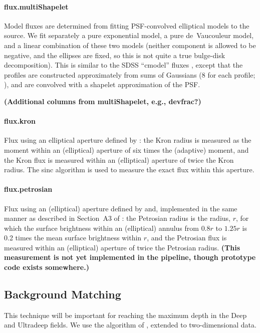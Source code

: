 \documentclass[12pt]{article}
\newcommand\tbd[1]{\textbf{\color{red}(#1)}}
\begin{document}
\paragraph{flux.multiShapelet}
Model fluxes are determined from fitting PSF-convolved elliptical models to the source.  We fit separately a
pure exponential model, a pure de\ Vaucouleur model, and a linear combination of these two models (neither
component is allowed to be negative, and the ellipses are fixed, so this is not quite a true bulge-disk
decomposition).  This is similar to the SDSS ``cmodel'' fluxes \citep{SdssPhoto}, except that the profiles are
constructed approximately from sums of Gaussians (8 for each profile; \citealt{HoggLangMoG}), and are
convolved with a shapelet approximation of the PSF.

\tbd{Additional columns from multiShapelet, e.g., devfrac?}

\paragraph{flux.kron}
Flux using an elliptical aperture defined by \citet{1980ApJS...43..305K}: the Kron radius is measured as the
moment within an (elliptical) aperture of six times the (adaptive) moment, and the Kron flux is measured
within an (elliptical) aperture of twice the Kron radius.  The sinc algorithm is used to measure the exact
flux within this aperture.

\paragraph{flux.petrosian}
Flux using an (elliptical) aperture defined by \citet{1976ApJ...209L...1P} and, implemented in the same manner
as described in Section~A3 of \citet{2002AJ....124.1810S}: the Petrosian radius is the radius, $r$, for which
the surface brightness within an (elliptical) annulus from $0.8r$ to $1.25r$ is 0.2 times the mean surface
brightness within $r$, and the Petrosian flux is measured within an (elliptical) aperture of twice the
Petrosian radius.  \tbd{This measurement is not yet implemented in the pipeline, though prototype code exists
  somewhere.}



\subsection{Background Matching}
\label{alg:backgroundMatching}

This technique will be important for reaching the maximum depth in the Deep and Ultradeep fields.  We use the
algorithm of \citealt{2011arXiv1111.6958H}, extended to two-dimensional data.
\end{document}
